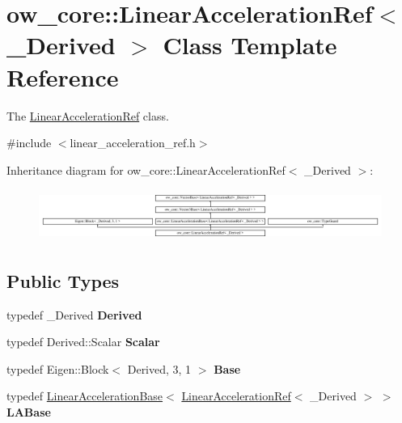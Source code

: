 \hypertarget{classow__core_1_1LinearAccelerationRef}{}\section{ow\+\_\+core\+:\+:Linear\+Acceleration\+Ref$<$ \+\_\+\+Derived $>$ Class Template Reference}
\label{classow__core_1_1LinearAccelerationRef}


The \hyperlink{classow__core_1_1LinearAccelerationRef}{Linear\+Acceleration\+Ref} class.  




{\ttfamily \#include $<$linear\+\_\+acceleration\+\_\+ref.\+h$>$}

Inheritance diagram for ow\+\_\+core\+:\+:Linear\+Acceleration\+Ref$<$ \+\_\+\+Derived $>$\+:\begin{figure}[H]
\begin{center}
\leavevmode
\includegraphics[height=1.704718cm]{d2/d75/classow__core_1_1LinearAccelerationRef}
\end{center}
\end{figure}
\subsection*{Public Types}
\begin{DoxyCompactItemize}
\item 
typedef \+\_\+\+Derived {\bfseries Derived}\hypertarget{classow__core_1_1LinearAccelerationRef_aba03ae2dd6572abc254c71c0b4032bd1}{}\label{classow__core_1_1LinearAccelerationRef_aba03ae2dd6572abc254c71c0b4032bd1}

\item 
typedef Derived\+::\+Scalar {\bfseries Scalar}\hypertarget{classow__core_1_1LinearAccelerationRef_a1e779f915a06a0aad91be2ebc1125048}{}\label{classow__core_1_1LinearAccelerationRef_a1e779f915a06a0aad91be2ebc1125048}

\item 
typedef Eigen\+::\+Block$<$ Derived, 3, 1 $>$ {\bfseries Base}\hypertarget{classow__core_1_1LinearAccelerationRef_addbc11e09c28b0c93157fa1272285f37}{}\label{classow__core_1_1LinearAccelerationRef_addbc11e09c28b0c93157fa1272285f37}

\item 
typedef \hyperlink{classow__core_1_1LinearAccelerationBase}{Linear\+Acceleration\+Base}$<$ \hyperlink{classow__core_1_1LinearAccelerationRef}{Linear\+Acceleration\+Ref}$<$ \+\_\+\+Derived $>$ $>$ {\bfseries L\+A\+Base}\hypertarget{classow__core_1_1LinearAccelerationRef_a96a26ebdb1dc41f82811b2689d912317}{}\label{classow__core_1_1LinearAccelerationRef_a96a26ebdb1dc41f82811b2689d912317}

\end{DoxyCompactItemize}
